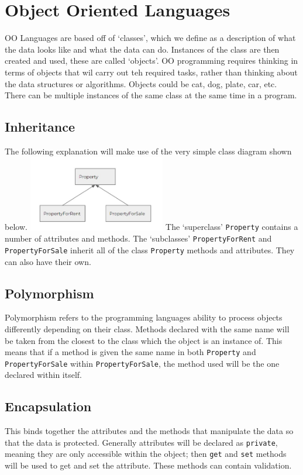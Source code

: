 \documentclass[a4paper,11pt, twocolumn]{article}
\begin{document}
\section{Object Oriented Languages}
OO Languages are based off of `classes', which we define as a description of what the data looks like and what the data can do. Instances of the class are then created and used, these are called `objects'. OO programming requires thinking in terms of objects that wil carry out teh required tasks, rather than thinking about the data structures or algorithms. Objects could be cat, dog, plate, car, etc. There can be multiple instances of the same class at the same time in a program.
\subsection{Inheritance}
The following explanation will make use of the very simple class diagram shown below.
\includegraphics[width=0.45\textwidth]{basicClassDiagram.jpg}
The `superclass' \verb|Property| contains a number of attributes and methods. The `subclasses' \verb|PropertyForRent| and \verb|PropertyForSale| inherit all of the class \verb|Property| methods and attributes. They can also have their own.
\subsection{Polymorphism}
Polymorphism refers to the programming languages ability to process objects differently depending on their class. Methods declared with the same name will be taken from the closest to the class which the object is an instance of. This means that if a method is given the same name in both \verb|Property| and \verb|PropertyForSale| within \verb|PropertyForSale|, the method used will be the one declared within itself. 
\subsection{Encapsulation}
This binds together the attributes and the methods that manipulate the data so that the data is protected. Generally attributes will be declared as \verb|private|, meaning they are only accessible within the object; then \verb|get| and \verb|set| methods will be used to get and set the attribute. These methods can contain validation.
\end{document}
